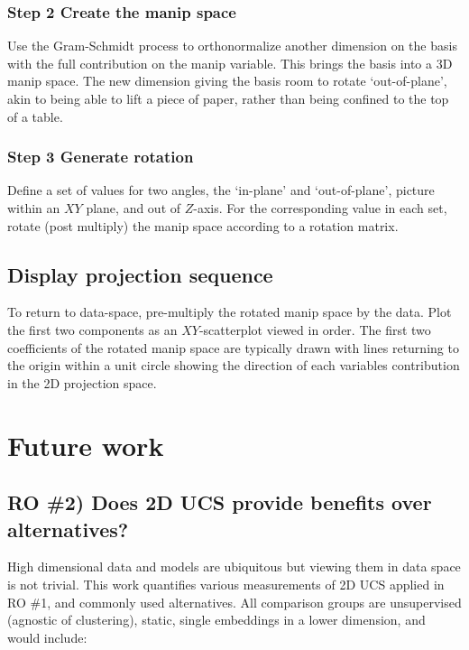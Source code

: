 \documentclass{monashthesis}
\begin{document}
\subsection{Step 2 Create the manip
space}\label{step-2-create-the-manip-space}

Use the Gram-Schmidt process to orthonormalize another dimension on the
basis with the full contribution on the manip variable. This brings the
basis into a 3D manip space. The new dimension giving the basis room to
rotate `out-of-plane', akin to being able to lift a piece of paper,
rather than being confined to the top of a table.

\subsection{Step 3 Generate rotation}\label{step-3-generate-rotation}

Define a set of values for two angles, the `in-plane' and
`out-of-plane', picture within an \(XY\) plane, and out of \(Z\)-axis.
For the corresponding value in each set, rotate (post multiply) the
manip space according to a rotation matrix.

\section{Display projection sequence}\label{display-projection-sequence}

To return to data-space, pre-multiply the rotated manip space by the
data. Plot the first two components as an \(XY\)-scatterplot viewed in
order. The first two coefficients of the rotated manip space are
typically drawn with lines returning to the origin within a unit circle
showing the direction of each variables contribution in the 2D
projection space.

\chapter{Future work}\label{ch:future_work}

\section{RO \#2) Does 2D UCS provide benefits over
alternatives?}\label{ro-2-does-2d-ucs-provide-benefits-over-alternatives}

High dimensional data and models are ubiquitous but viewing them in data
space is not trivial. This work quantifies various measurements of 2D
UCS applied in RO \#1, and commonly used alternatives. All comparison
groups are unsupervised (agnostic of clustering), static, single
embeddings in a lower dimension, and would include:
\end{document}
